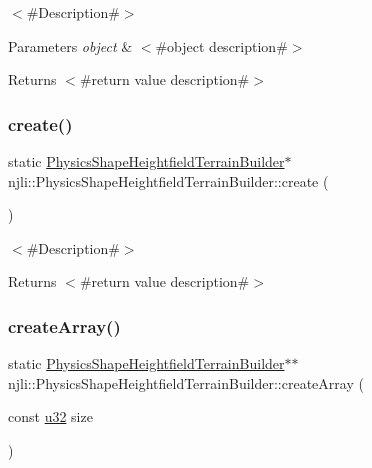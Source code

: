 $<$\#\+Description\#$>$


\begin{DoxyParams}{Parameters}
{\em object} & $<$\#object description\#$>$\\
\hline
\end{DoxyParams}
\begin{DoxyReturn}{Returns}
$<$\#return value description\#$>$ 
\end{DoxyReturn}
\mbox{\label{classnjli_1_1_physics_shape_heightfield_terrain_builder_a7352753e6659e11627dd2fc1a2b505dd}} 
\subsubsection{\texorpdfstring{create()}{create()}}
{\footnotesize\ttfamily static \mbox{\hyperlink{classnjli_1_1_physics_shape_heightfield_terrain_builder}{Physics\+Shape\+Heightfield\+Terrain\+Builder}}$\ast$ njli\+::\+Physics\+Shape\+Heightfield\+Terrain\+Builder\+::create (\begin{DoxyParamCaption}{ }\end{DoxyParamCaption})\hspace{0.3cm}{\ttfamily [static]}}

$<$\#\+Description\#$>$

\begin{DoxyReturn}{Returns}
$<$\#return value description\#$>$ 
\end{DoxyReturn}
\mbox{\label{classnjli_1_1_physics_shape_heightfield_terrain_builder_a29698c623a44d1dd7b84b7d60af1862a}} 
\subsubsection{\texorpdfstring{create\+Array()}{createArray()}}
{\footnotesize\ttfamily static \mbox{\hyperlink{classnjli_1_1_physics_shape_heightfield_terrain_builder}{Physics\+Shape\+Heightfield\+Terrain\+Builder}}$\ast$$\ast$ njli\+::\+Physics\+Shape\+Heightfield\+Terrain\+Builder\+::create\+Array (\begin{DoxyParamCaption}\item[{const \mbox{\hyperlink{_util_8h_a10e94b422ef0c20dcdec20d31a1f5049}{u32}}}]{size }\end{DoxyParamCaption})\hspace{0.3cm}{\ttfamily [static]}}

